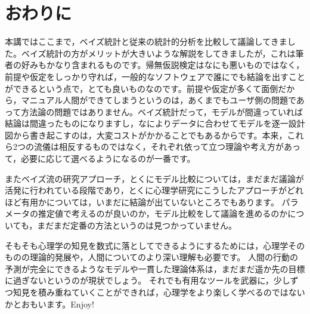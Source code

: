 \documentclass{ltjsbook}
\begin{document}
\section{おわりに}
本講ではここまで，ベイズ統計と従来の統計的分析を比較して議論してきました。ベイズ統計の方がメリットが大きいような解説をしてきましたが，これは筆者の好みもかなり含まれるものです。帰無仮説検定はなにも悪いものではなく，前提や仮定をしっかり守れば，一般的なソフトウェアで誰にでも結論を出すことができるという点で，とても良いものなのです。前提や仮定が多くて面倒だから，マニュアル人間ができてしまうというのは，あくまでもユーザ側の問題であって方法論の問題ではありません。ベイズ統計だって，モデルが間違っていれば結論は間違ったものになりますし，なによりデータに合わせてモデルを逐一設計図から書き起こすのは，大変コストがかかることでもあるからです。本来，これら2つの流儀は相反するものではなく，それぞれ依って立つ理論や考え方があって，必要に応じて選べるようになるのが一番です。

またベイズ流の研究アプローチ，とくにモデル比較については，まだまだ議論が活発に行われている段階であり，とくに心理学研究にこうしたアプローチがどれほど有用かについては，いまだに結論が出ていないところでもあります。
パラメータの推定値で考えるのが良いのか，モデル比較をして議論を進めるのかについても，まだまだ定番の方法というのは見つかっていません。

そもそも心理学の知見を数式に落としてできるようにするためには，心理学そのものの理論的発展や，人間についてのより深い理解も必要です。
人間の行動の予測が完全にできるようなモデルや一貫した理論体系は，まだまだ遥か先の目標に過ぎないというのが現状でしょう。
それでも有用なツールを武器に，少しずつ知見を積み重ねていくことができれば，心理学をより楽しく学べるのではないかとおもいます。Enjoy!
\end{document}
